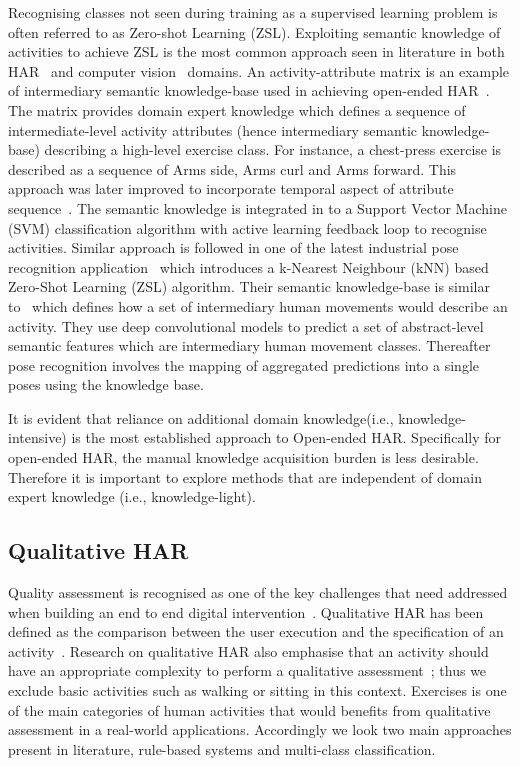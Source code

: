 \documentclass[runningheads]{llncs}
\begin{document}
Recognising classes not seen during training as a supervised learning problem is often referred to as Zero-shot Learning (ZSL). Exploiting semantic knowledge of activities to achieve ZSL is the most common approach seen in literature in both HAR~\cite{liu2011recognizing,cheng2013nuactiv,cheng2013towards} and computer vision~\cite{lampert2009learning,lampert2014attribute} domains. 
An activity-attribute matrix is an example of intermediary semantic knowledge-base used in achieving open-ended HAR~\cite{cheng2013nuactiv,cheng2013towards}. The matrix provides domain expert knowledge which defines a sequence of intermediate-level activity attributes (hence intermediary semantic knowledge-base) describing a high-level exercise class. For instance, a chest-press exercise is described as a sequence of Arms side, Arms curl and Arms forward. This approach was later improved to incorporate temporal aspect of attribute sequence~\cite{cheng2013nuactiv}. The semantic knowledge is integrated in to a Support Vector Machine (SVM) classification algorithm with active learning feedback loop to recognise activities. 
Similar approach is followed in one of the latest industrial pose recognition application~\cite{ohashi2018attributes} which introduces a k-Nearest Neighbour (kNN) based Zero-Shot Learning (ZSL) algorithm. Their semantic knowledge-base is similar to~\cite{cheng2013nuactiv} which defines how a set of intermediary human movements would describe an activity. They use deep convolutional models to predict a set of abstract-level semantic features which are intermediary human movement classes. Thereafter pose recognition involves the mapping of aggregated predictions into a single poses using the knowledge base. 

It is evident that reliance on additional domain knowledge(i.e., knowledge-intensive) is the most established approach to Open-ended HAR. Specifically for open-ended HAR, the manual knowledge acquisition burden is less desirable. Therefore it is important to explore methods that are independent of domain expert knowledge (i.e., knowledge-light).  

\subsection{Qualitative HAR}
Quality assessment is recognised as one of the key challenges that need addressed when building an end to end digital intervention~\cite{wang2018deep}. Qualitative HAR has been defined as the comparison between the user execution and the specification of an activity~\cite{velloso2013qualitative}. Research on qualitative HAR also emphasise that an activity should have an appropriate complexity to perform a qualitative assessment~\cite{velloso2013qualitative}; thus we exclude basic activities such as walking or sitting in this context. Exercises is one of the main categories of human activities that would benefits from qualitative assessment in a real-world applications. Accordingly we look two main approaches present in literature, rule-based systems and multi-class classification. 
\end{document}
